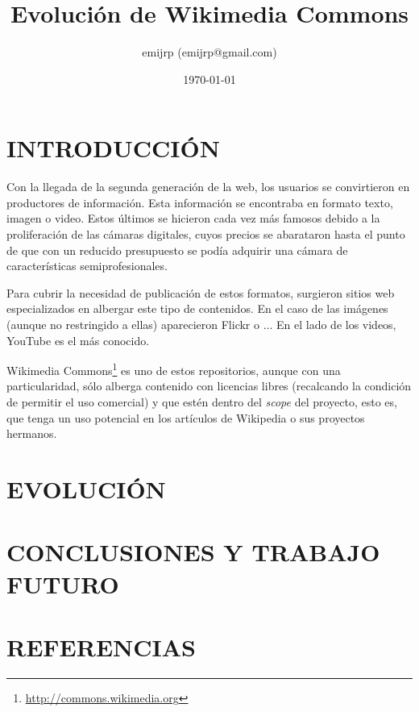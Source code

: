 \documentclass[11pt,twocolumn]{article}
\title{Evolución de Wikimedia Commons}
\author{emijrp (emijrp@gmail.com)}
\date{\today}
\begin{document}
\maketitle



\section{\uppercase{Introducción}}


Con la llegada de la segunda generación de la web, los usuarios se convirtieron en productores de información. Esta información se encontraba en formato texto, imagen o video. Estos últimos se hicieron cada vez más famosos debido a la proliferación de las cámaras digitales, cuyos precios se abarataron hasta el punto de que con un reducido presupuesto se podía adquirir una cámara de características semiprofesionales.

Para cubrir la necesidad de publicación de estos formatos, surgieron sitios web especializados en albergar este tipo de contenidos. En el caso de las imágenes (aunque no restringido a ellas) aparecieron Flickr o ... En el lado de los videos, YouTube es el más conocido.

Wikimedia Commons\footnote{\url{http://commons.wikimedia.org}} es uno de estos repositorios, aunque con una particularidad, sólo alberga contenido con licencias libres (recalcando la condición de permitir el uso comercial) y que estén dentro del \textit{scope} del proyecto, esto es, que tenga un uso potencial en los artículos de Wikipedia o sus proyectos hermanos.

\section{\uppercase{Evolución}}

\section{\uppercase{Conclusiones y trabajo futuro}}

\section{\uppercase{Referencias}}
\end{document}
